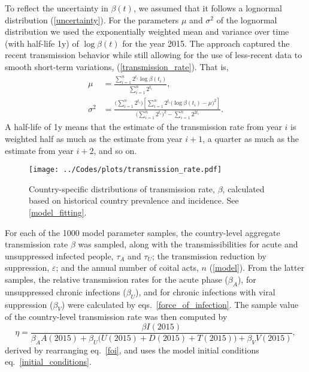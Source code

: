 \documentclass{article}
\begin{document}
To reflect the uncertainty in $\beta(t)$, we assumed that it follows a
lognormal distribution (\autoref{uncertainty}). For the parameters $\mu$ and
$\sigma^2$ of the lognormal distribution we used the exponentially
weighted mean and variance \cite{holt2004} over time (with half-life
1\;y) of $\log \beta(t)$ for the year 2015. The approach captured the recent
transmission behavior while still allowing for the use of less-recent
data to smooth short-term variations,
(\autoref{transmission_rate}).  That is,
\begin{equation}
  \begin{split}
    \mu &= \frac{\sum_{i = 1}^n  2^{t_i}
      \log \beta(t_i)}
    {\sum_{i = 1}^n 2^{t_i}},
    \\
    \sigma^2 &= \frac{\big(\sum_{i = 1}^n 2^{t_i}\big)
      \left[\sum_{i = 1}^n  2^{t_i}
        \big(\log \beta(t_i) - \mu\big)^2\right]}
    {\big(\sum_{i = 1}^n 2^{t_i}\big)^2
      - \sum_{i = 1}^n 2^{2 t_i}}.
  \end{split}
\end{equation}
A half-life of 1\;y means that the estimate of the transmission rate
from year $i$ is weighted half as much as the estimate from year
$i + 1$, a quarter as much as the estimate from year $i + 2$, and so
on.

\begin{figure}
  \centering
  \texttt{[image: ../Codes/plots/transmission\_rate.pdf]}
  \caption{Country-specific distributions of transmission rate,
    $\beta$, calculated based on historical country prevalence and
    incidence.  See \autoref{model_fitting}.}
  \label{transmission_rate}
\end{figure}

For each of the 1000 model parameter samples, the country-level
aggregate transmission rate $\beta$ was sampled, along with the
transmissibilities for acute and unsuppressed infected people,
$\tau_A$ and $\tau_U$; the transmission reduction by suppression,
$\varepsilon$; and the annual number of coital acts, $n$
(\autoref{model}).  From the latter samples, the relative transmission
rates for the acute phase ($\beta_A$), for unsuppressed chronic
infections ($\beta_U$), and for chronic infections with viral
suppression ($\beta_V$) were calculated by
eqs.~\eqref{force_of_infection}.  The sample value of the
country-level transmission rate was then computed by
\begin{equation}
  \label{eta}
  \eta = \frac{\beta I(2015)}{
    \beta_A A(2015) + \beta_U \big(U(2015) + D(2015) + T(2015)\big)
    + \beta_V V(2015)},
\end{equation}
derived by rearranging eq.~\eqref{foi}, and uses the model initial
conditions eq.~\eqref{initial_conditions}.
\end{document}
